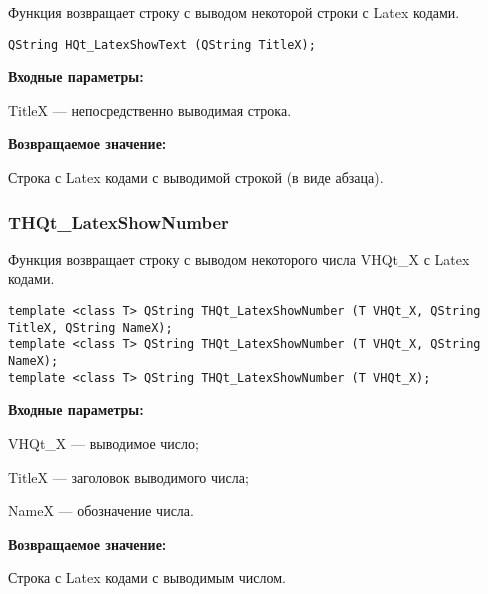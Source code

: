 \documentclass[a4paper,12pt]{article}
\begin{document}
Функция возвращает строку с выводом некоторой строки с Latex кодами.


\begin{lstlisting}[label=code_syntax_HQt_LatexShowText,caption=Синтаксис]
QString HQt_LatexShowText (QString TitleX);
\end{lstlisting}

\textbf{Входные параметры:}

TitleX --- непосредственно выводимая строка.

\textbf{Возвращаемое значение:}

Строка с Latex кодами с выводимой строкой (в виде абзаца).


\subsubsection{THQt\_LatexShowNumber}\label{THQt_LatexShowNumber}

Функция возвращает строку с выводом некоторого числа VHQt\_X с Latex кодами.


\begin{lstlisting}[label=code_syntax_THQt_LatexShowNumber,caption=Синтаксис]
template <class T> QString THQt_LatexShowNumber (T VHQt_X, QString TitleX, QString NameX);
template <class T> QString THQt_LatexShowNumber (T VHQt_X, QString NameX);
template <class T> QString THQt_LatexShowNumber (T VHQt_X);
\end{lstlisting}

\textbf{Входные параметры:}
 
VHQt\_X --- выводимое число;
 
TitleX --- заголовок выводимого числа;
 
NameX --- обозначение числа.

\textbf{Возвращаемое значение:}

Строка с Latex кодами с выводимым числом.

\end{document}
